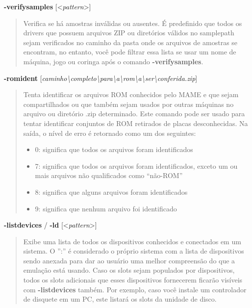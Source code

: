 \documentclass[letterpaper,10pt,brazil]{sphinxmanual}
\begin{document}
\label{commandline/commandline-all:mame-commandline-verifysamples}
\textbf{-verifysamples} {[}\textless{}\emph{pattern}\textgreater{}{]}
\begin{quote}

Verifica se há amostras inválidas ou ausentes. É predefinido que
todos os drivers que possuem arquivos ZIP ou diretórios válidos no
samplepath sejam verificados no caminho da pasta onde os arquivos de
amostras se encontram, no entanto, você pode filtrar essa lista se
usar um nome de máquina, jogo ou coringa após o comando
\textbf{-verifysamples}.
\end{quote}
\label{commandline/commandline-all:mame-commandline-romident}
\textbf{-romident} {[}\emph{caminho\textbackslash{}completo\textbackslash{}para\textbackslash{}a\textbackslash{}rom\textbackslash{}a\textbackslash{}ser\textbackslash{}conferida.zip}{]}
\begin{quote}

Tenta identificar os arquivos ROM conhecidos pelo MAME e que sejam
compartilhados ou que também sejam usados por outras máquinas no
arquivo ou diretório .zip determinado. Este comando pode ser usado
para tentar identificar conjuntos de ROM retirados de placas
desconhecidas.
Na saída, o nível de erro é retornado como um dos seguintes:
\begin{itemize}
\item {} 
0: significa que todos os arquivos foram identificados

\item {} 
7: significa que todos os arquivos foram identificados, exceto um ou mais arquivos não qualificados como ``não-ROM''

\item {} 
8: significa que alguns arquivos foram identificados

\item {} 
9: significa que nenhum arquivo foi identificado

\end{itemize}
\end{quote}
\label{commandline/commandline-all:mame-commandline-listdevices}
\textbf{-listdevices} / \textbf{-ld} {[}\textless{}\emph{pattern}\textgreater{}{]}
\begin{quote}

Exibe uma lista de todos os dispositivos conhecidos e conectados
em um sistema. O '':'' é considerado o próprio sistema
com a lista de dispositivos sendo anexada para dar ao usuário
uma melhor compreensão do que a emulação está usando. Caso os
slots sejam populados por dispositivos, todos os slots
adicionais que esses dispositivos fornecerem ficarão visíveis
com \textbf{-listdevices} também.
Por exemplo, caso você instale um controlador de disquete em um
PC, este listará os slots da unidade de disco.
\end{quote}
\end{document}
